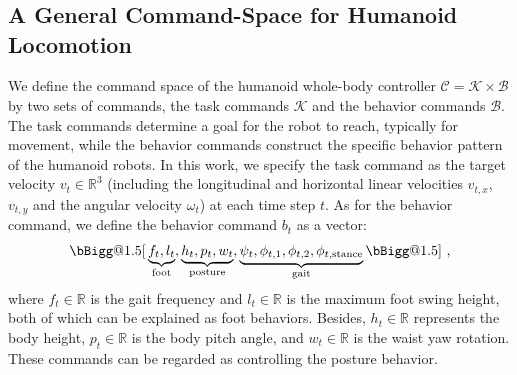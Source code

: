
\section{\our}
\subsection{A General Command-Space for Humanoid Locomotion}\label{sec:command-space}
We define the command space of the humanoid whole-body controller $\mathcal{C}=\mathcal{K}\times\mathcal{B}$ by two sets of commands, the task commands $\mathcal{K}$ and the behavior commands $\mathcal{B}$. The task commands determine a goal for the robot to reach, typically for movement, while the behavior commands construct the specific behavior pattern of the humanoid robots. In this work, we specify the task command as the target velocity $v_{t} \in \mathbb{R}^3$ (including the longitudinal and horizontal linear velocities $v_{t,x}$, $v_{t,y}$ and the angular velocity $\omega_t$) at each time step $t$. As for the behavior command, we define the behavior command $b_t$ as a vector:
\begin{equation}
\begin{aligned}
{\mathopen{\bBigg@{1.5}{[}}}          
         \underbrace{f_t,
         l_t}_{\text{foot}},
         \underbrace{h_t,
         p_t,
         w_t}_{\text{posture}},
         \underbrace{\psi_t,
         \phi_{t,1},
         \phi_{t,2},
         \phi_{t,\text{stance}}}_\text{gait}
     {\mathclose{\bBigg@{1.5}]}}~,
\end{aligned}
\end{equation}
where
$f_t \in \mathbb R$ is the gait frequency and $l_t \in \mathbb{R}$ is the maximum foot swing height, both of which can be explained as foot behaviors.
Besides, $h_t \in \mathbb{R}$ represents the body height, $p_t \in \mathbb{R}$ is the body pitch angle, and $w_t \in \mathbb{R}$ is the waist yaw rotation. These commands can be regarded as controlling the posture behavior.

